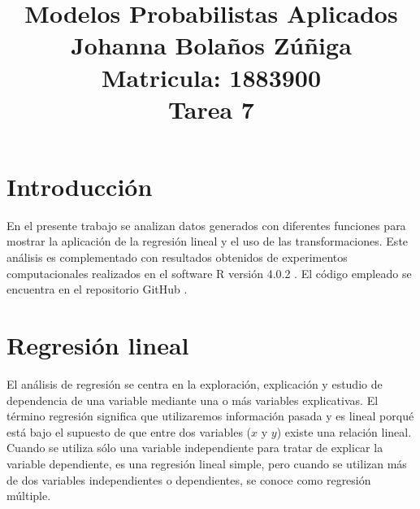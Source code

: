 \documentclass{article}
\title{
\centering
Modelos Probabilistas Aplicados \\
Johanna Bolaños Zúñiga \\
Matricula: 1883900\\
Tarea 7
}
\date{}
\begin{document}
\maketitle

\section{Introducción}
En el presente trabajo se analizan datos generados con diferentes funciones para mostrar la aplicación de la regresión lineal y el uso de las transformaciones. Este análisis es complementado con resultados obtenidos de experimentos computacionales realizados en el software R versión 4.0.2 \cite{r}. El código empleado se encuentra en el repositorio GitHub \cite{github}.

\section{Regresión lineal}
El análisis de regresión se centra en la exploración, explicación y estudio de dependencia de una variable mediante una o más variables explicativas. El término regresión significa que utilizaremos información pasada y es lineal porqué está bajo el supuesto de que entre dos variables ($x$ y $y$) existe una relación lineal. Cuando se utiliza sólo una variable independiente para tratar de explicar la variable dependiente, es una regresión lineal simple, pero cuando se utilizan más de dos variables independientes o dependientes, se conoce como regresión múltiple.
 
\end{document}
